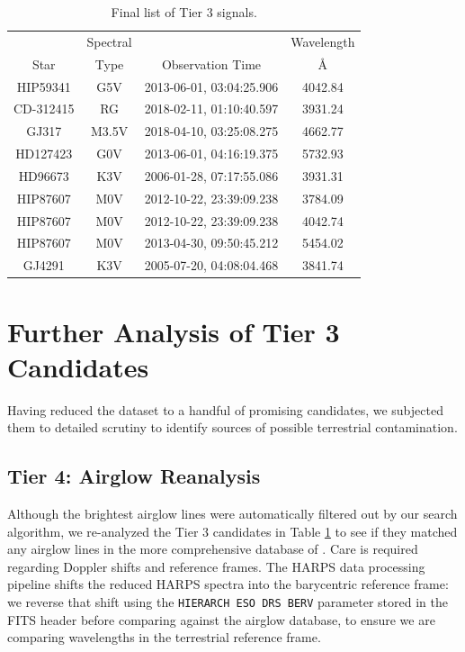 \documentclass[twocolumn]{aastex701}
\begin{document}
\begin{table}
\begin{center}
\begin{tabular}{|c|c|c|c|} 
 \hline
& Spectral & & Wavelength\\
 Star & Type & Observation Time & \AA \\ 
\hline
 HIP59341 & G5V & 2013-06-01, 03:04:25.906 & 4042.84  \\
 CD-312415 & RG & 2018-02-11, 01:10:40.597 & 3931.24  \\ 
 GJ317 & M3.5V & 2018-04-10, 03:25:08.275 &  4662.77  \\ 
 HD127423 & G0V & 2013-06-01, 04:16:19.375 &  5732.93  \\
 HD96673 & K3V & 2006-01-28, 07:17:55.086 & 3931.31  \\
 HIP87607  & M0V & 2012-10-22, 23:39:09.238 & 3784.09  \\
 HIP87607  & M0V & 2012-10-22, 23:39:09.238 & 4042.74 \\
 HIP87607  & M0V & 2013-04-30, 09:50:45.212 & 5454.02 \\
 GJ4291 & K3V & 2005-07-20, 04:08:04.468 & 3841.74  \\
 \hline
 \end{tabular}
\end{center}
\caption{Final list of Tier 3 signals.}
\label{table:tier_3_candidates}
\end{table}

\section{Further Analysis of Tier 3 Candidates}

Having reduced the dataset to a handful of promising candidates, we subjected them to detailed scrutiny to identify sources of possible terrestrial contamination.

\subsection{Tier 4: Airglow Reanalysis}
\label{s:airglow_reanalysis}

Although the brightest airglow lines were automatically filtered out by our search algorithm, we re-analyzed the Tier 3 candidates in Table \ref{table:tier_3_candidates} to see if they matched any airglow lines in the more comprehensive database of \cite{faint_airglow_database}.  Care is required regarding Doppler shifts and reference frames. The HARPS data processing pipeline shifts the reduced HARPS spectra into the barycentric reference frame: we reverse that shift using the \texttt{HIERARCH ESO DRS BERV} parameter stored in the FITS header before comparing against the airglow database, to ensure we are comparing wavelengths in the terrestrial reference frame.
\end{document}
